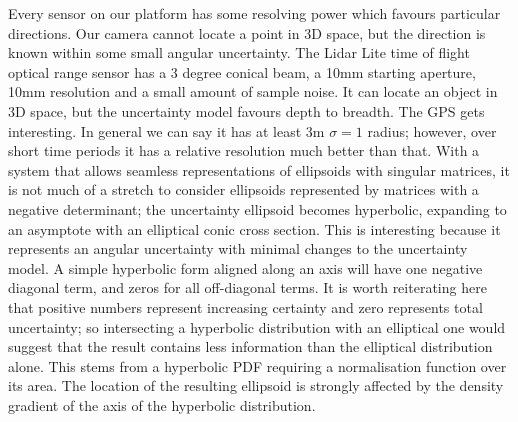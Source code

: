 \documentclass{article}
\newcounter{subsubsubsection}[subsubsection]
\begin{document}
        Every sensor on our platform has some resolving power which favours particular directions.
        Our camera cannot locate a point in 3D space, but the direction is known within some small angular uncertainty.
        The Lidar Lite time of flight optical range sensor has a 3 degree conical beam, a 10mm starting aperture, 10mm resolution and a small amount of sample noise. It can locate an object in 3D space, but the uncertainty model favours depth to breadth.
        The GPS gets interesting.  In general we can say it has at least 3m \(\sigma=1\) radius; however, over short time periods it has a relative resolution much better than that.
        \label{sec:hyperbolicCase}
        With a system that allows seamless representations of ellipsoids with singular matrices, it is not much of a stretch to consider ellipsoids represented by matrices with a negative determinant; the uncertainty ellipsoid becomes hyperbolic, expanding to an asymptote with an elliptical conic cross section.  This is interesting because it represents an angular uncertainty with minimal changes to the uncertainty model.
        A simple hyperbolic form aligned along an axis will have one negative diagonal term, and zeros for all off-diagonal terms.
        It is worth reiterating here that positive numbers represent increasing certainty and zero represents total uncertainty; so intersecting a hyperbolic distribution with an elliptical one would suggest that the result contains less information than the elliptical distribution alone.
        This stems from a hyperbolic PDF requiring a normalisation function over its area.  The location of the resulting ellipsoid is strongly affected by the density gradient of the axis of the hyperbolic distribution.
\end{document}
